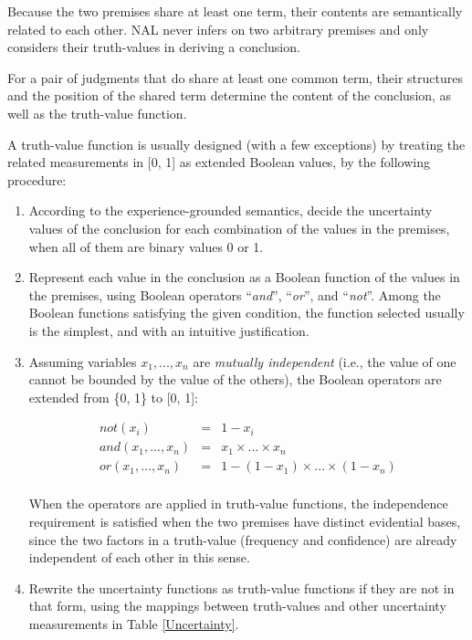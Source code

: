Because the two premises share at least one term, their contents are semantically related to each other. NAL never infers on two arbitrary premises and only considers their truth-values in deriving a conclusion.

For a pair of judgments that do share at least one common term, their structures and the position of the shared term determine the content of the conclusion, as well as the truth-value function.

A truth-value function is usually designed (with a few exceptions) by treating the related measurements in [0, 1] as extended Boolean values, by the following procedure:
\begin{enumerate}
	\item
According to the experience-grounded semantics, decide the uncertainty values of the conclusion for each combination of the values in the premises, when all of them are binary values 0 or 1. 
	\item 
Represent each value in the conclusion as a Boolean function of the values in the premises, using Boolean operators  ``{\em and}'', ``{\em or}'', and ``{\em not}''. Among the Boolean functions satisfying the given condition, the function selected usually is the simplest, and with an intuitive justification.
	\item 
Assuming variables \(x_1, ..., x_n\) are \emph{mutually independent} (i.e., the value of one cannot be bounded by the value of the others), the Boolean operators are extended from \{0, 1\} to [0, 1]:
\begin{defi}
\[\begin{array}{rcl}
not(x_i) & = & 1 - x_i \\
and(x_1, ..., x_n) & = & x_1 \times ... \times x_n \\
or(x_1, ..., x_n) & = & 1 - (1 - x_1) \times ... \times (1 - x_n) \\
\end{array}\]
\end{defi}
When the operators are applied in truth-value functions, the independence requirement is satisfied when the two premises have distinct evidential bases, since the two factors in a truth-value (frequency and confidence) are already independent of each other in this sense.
  \item
Rewrite the uncertainty functions as truth-value functions if they are not in that form, using the mappings between truth-values and other uncertainty measurements in Table \ref{Uncertainty}.
\end{enumerate}

